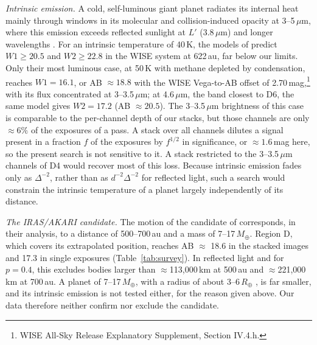 \documentclass[twocolumn,linenumbers]{aastex702}
\begin{document}
\emph{Intrinsic emission.} A cold, self-luminous giant planet radiates its internal heat mainly through windows in its molecular and collision-induced opacity at 3--5\,$\mu$m, where this emission exceeds reflected sunlight at $L'$ (3.8\,$\mu$m) and longer wavelengths \citep{fortney16}. For an intrinsic temperature of 40\,K, the models of \citet{fortney16} predict $W1 \ge 20.5$ and $W2 \ge 22.8$ in the WISE system at 622\,au, far below our limits. Only their most luminous case, at 50\,K with methane depleted by condensation, reaches $W1 = 16.1$, or AB $\approx 18.8$ with the WISE Vega-to-AB offset of 2.70\,mag,\footnote{WISE All-Sky Release Explanatory Supplement, Section IV.4.h.} with its flux concentrated at 3--3.5\,$\mu$m; at 4.6\,$\mu$m, the band closest to D6, the same model gives $W2 = 17.2$ (AB $\approx 20.5$). The 3--3.5\,$\mu$m brightness of this case is comparable to the per-channel depth of our stacks, but those channels are only $\approx 6\%$ of the exposures of a pass. A stack over all channels dilutes a signal present in a fraction $f$ of the exposures by $f^{1/2}$ in significance, or $\approx 1.6$\,mag here, so the present search is not sensitive to it. A stack restricted to the 3--3.5\,$\mu$m channels of D4 would recover most of this loss. Because intrinsic emission fades only as $\Delta^{-2}$, rather than as $d^{-2}\Delta^{-2}$ for reflected light, such a search would constrain the intrinsic temperature of a planet largely independently of its distance.

\emph{The IRAS/AKARI candidate.} The motion of the candidate of \citet{phan25} corresponds, in their analysis, to a distance of 500--700\,au and a mass of 7--17\,$M_\oplus$. Region D, which covers its extrapolated position, reaches AB $\approx$ 18.6 in the stacked images and 17.3 in single exposures (Table~\ref{tab:survey}). In reflected light and for $p = 0.4$, this excludes bodies larger than $\approx$113{,}000\,km at 500\,au and $\approx$221{,}000\,km at 700\,au. A planet of 7--17\,$M_\oplus$, with a radius of about 3--6\,$R_\oplus$ \citep{fortney16}, is far smaller, and its intrinsic emission is not tested either, for the reason given above. Our data therefore neither confirm nor exclude the candidate.
\end{document}
